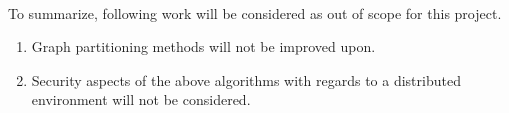 \paragraph{}
To summarize, following work will be considered as out of scope for this project. 

\begin{enumerate}
    \item Graph partitioning methods will not be improved upon.
    \item Security aspects of the above algorithms with regards to a distributed environment will not be considered.
\end{enumerate}